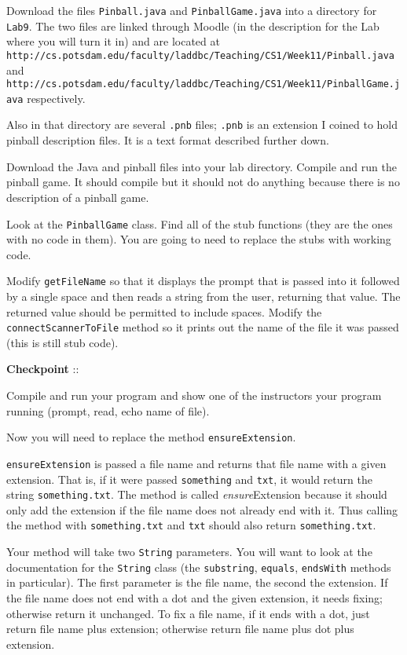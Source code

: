 \documentclass[12pt,oneside]{memoir}
\newcommand\code[1]{\lstinline^#1^}
\newcommand\fname[1]{\texttt{#1}}
\newcounter{LabPhase}
\newenvironment{LabExercises}{%
\renewcommand{\ExerciseListName}{Question}%
\renewcommand{\ExerciseListHeader}{\textbf{%
   Phase\ExerciseHeaderNB. }}
\begin{ExerciseList}}%
{\end{ExerciseList}}
\newcommand{\LabExercise}{\Exercise[name={Lab Phase\ExerciseHeaderNB},counter={LabPhase}]}
\newcounter{CheckPoint}
\newcommand{\Checkpoint}{\textbf{Checkpoint \theCheckPoint }:: \addtocounter{CheckPoint}{1}}
\begin{document}
\begin{LabExercises}
\LabExercise Download the files \fname{Pinball.java} and
\code{PinballGame.java} into a directory for \fname{Lab9}. The two
files are linked through Moodle (in the description for the Lab where
you will turn it in) and are located at
\fname{http://cs.potsdam.edu/faculty/laddbc/Teaching/CS1/Week11/Pinball.java}
and
\fname{http://cs.potsdam.edu/faculty/laddbc/Teaching/CS1/Week11/PinballGame.java}
respectively.

Also in that directory are several \fname{.pnb} files; \fname{.pnb} is
an extension I coined to hold pinball description files. It is a text
format described further down.

Download the Java and pinball files into your lab directory. Compile
and run the pinball game. It should compile but it should not do
anything because there is no description of a pinball game. 

\LabExercise Look at the \code{PinballGame} class. Find all of the
stub functions (they are the ones with no code in them). You are going
to need to replace the stubs with working code.

\LabExercise Modify \code{getFileName} so that it displays the prompt
that is passed into it followed by a single space and then reads a
string from the user, returning that value. The returned value should
be permitted to include spaces. Modify the \code{connectScannerToFile}
method so it prints out the name of the file it was passed (this is
still stub code).

\Checkpoint Compile and run your program and show one of the
instructors your program running (prompt, read, echo name of file).

\LabExercise Now you will need to replace the method
\code{ensureExtension}.

\code{ensureExtension} is passed a file name and returns that file
name with a given extension. That is, if it were passed
\code{something} and \code{txt}, it would return the string
\code{something.txt}. The method is called \emph{ensure}Extension
because it should only add the extension if the file name does not
already end with it. Thus calling the method with \code{something.txt}
and \code{txt} should also return \code{something.txt}.

Your method will take two \code{String} parameters. You will want to
look at the documentation for the \code{String} class (the
\code{substring}, \code{equals}, \code{endsWith} methods in
particular). The first parameter is the file name, the second the
extension. If the file name does not end with a dot and the given
extension, it needs fixing; otherwise return it unchanged. To fix a
file name, if it ends with a dot, just return file name plus
extension; otherwise return file name plus dot plus extension.


\end{LabExercises}
\end{document}
